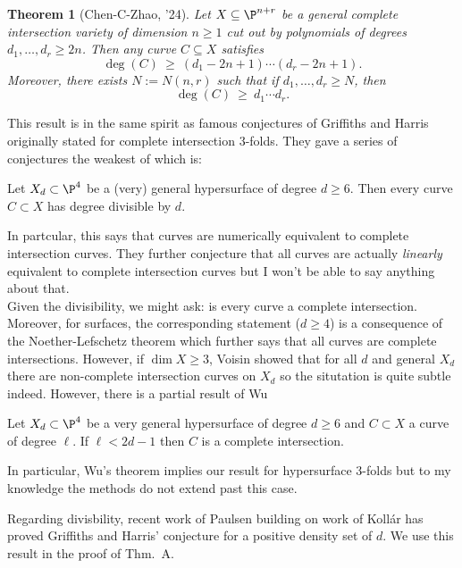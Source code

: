 \documentclass[12pt]{article}
\theoremstyle{plain}
\newtheorem{Lthm}{Theorem}
\begin{document}
\begin{Lthm}[Chen-C-Zhao, '24]
Let $X \subseteq \P^{n+r}$ be a general complete intersection variety of dimension $n \geq 1$ cut out by polynomials of degrees $d_{1}, \ldots, d_{r} \geq 2n$. Then any curve $C \subseteq X$ satisfies
\[ \deg(C)\ \ge\ (d_1 - 2n + 1) \cdots (d_r - 2n + 1) .\]
Moreover, there exists $N := N(n,r)$ such that if $d_1, \dots, d_r \ge N$, then
\[ \deg(C)\ \ge\ d_1 \cdots d_r. \]
\end{Lthm}

This result is in the same spirit as famous conjectures of Griffiths and Harris originally stated for complete intersection 3-folds. They gave a series of conjectures the weakest of which is:

\begin{conj}
Let $X_d \subset \P^4$ be a (very) general hypersurface of degree $d \ge 6$. Then every curve $C \subset X$ has degree divisible by $d$. 
\end{conj}

In partcular, this says that curves are numerically equivalent to complete intersection curves. They further conjecture that all curves are actually \textit{linearly} equivalent to complete intersection curves but I won't be able to say anything about that. 
\bigskip\\
Given the divisibility, we might ask: is every curve a complete intersection.
Moreover, for surfaces, the corresponding statement ($d \ge 4$) is a consequence of the Noether-Lefschetz theorem which further says that all curves are complete intersections. However, if $\dim{X} \ge 3$, Voisin showed that for all $d$ and general $X_d$ there are non-complete intersection curves on $X_d$ so the situtation is quite subtle indeed. However, there is a partial result of Wu
\begin{theorem}[Wu, '90]
Let $X_d \subset \P^4$ be a very general hypersurface of degree $d \ge 6$ and $C \subset X$ a curve of degree $\ell$. If $\ell < 2d - 1$ then $C$ is a complete intersection.
\end{theorem}

{\color{red} In particular, Wu's theorem implies our result for hypersurface 3-folds but to my knowledge the methods do not extend past this case.}

Regarding divisbility, recent work of Paulsen building on work of Koll\'{a}r has proved Griffiths and Harris' conjecture for a positive density set of $d$. We use this result in the proof of Thm.~A.
\end{document}
